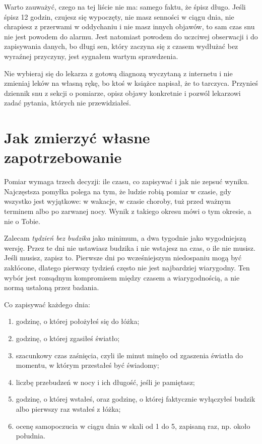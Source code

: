 Warto zauważyć, czego na tej liście nie ma: samego faktu, że śpisz długo. Jeśli śpisz 12 godzin, czujesz się wypoczęty, nie masz senności w ciągu dnia, nie chrapiesz z przerwami w oddychaniu i nie masz innych objawów, to sam czas snu nie jest powodem do alarmu. Jest natomiast powodem do uczciwej obserwacji i do zapisywania danych, bo długi sen, który zaczyna się z czasem wydłużać bez wyraźnej przyczyny, jest sygnałem wartym sprawdzenia.

\begin{uwaga}
  Nie wybieraj się do lekarza z gotową diagnozą wyczytaną z internetu i nie zmieniaj leków na własną rękę, bo ktoś w książce napisał, że \glqq to tarczyca\grqq{}. Przynieś dziennik snu z sekcji o pomiarze, opisz objawy konkretnie i pozwól lekarzowi zadać pytania, których nie przewidziałeś.
\end{uwaga}

\section{Jak zmierzyć własne zapotrzebowanie}

Pomiar wymaga trzech decyzji: ile czasu, co zapisywać i jak nie zepsuć wyniku. Najczęstsza pomyłka polega na tym, że ludzie robią pomiar w czasie, gdy wszystko jest wyjątkowe: w wakacje, w czasie choroby, tuż przed ważnym terminem albo po zarwanej nocy. Wynik z takiego okresu mówi o tym okresie, a nie o Tobie.

Zalecam \emph{tydzień bez budzika} jako minimum, a dwa tygodnie jako wygodniejszą wersję. Przez te dni nie ustawiasz budzika i nie wstajesz na czas, o ile nie musisz. Jeśli musisz, zapisz to. Pierwsze dni po wcześniejszym niedospaniu mogą być zakłócone, dlatego pierwszy tydzień często nie jest najbardziej wiarygodny. Ten wybór jest rozsądnym kompromisem między czasem a wiarygodnością, a nie normą ustaloną przez badania.

Co zapisywać każdego dnia:

\begin{enumerate}
  \item godzinę, o której położyłeś się do łóżka;
  \item godzinę, o której zgasiłeś światło;
  \item szacunkowy czas zaśnięcia, czyli ile minut minęło od zgaszenia światła do momentu, w którym przestałeś być świadomy;
  \item liczbę przebudzeń w nocy i ich długość, jeśli je pamiętasz;
  \item godzinę, o której wstałeś, oraz godzinę, o której faktycznie wyłączyłeś budzik albo pierwszy raz wstałeś z łóżka;
  \item ocenę samopoczucia w ciągu dnia w skali od 1 do 5, zapisaną raz, np. około południa.
\end{enumerate}

